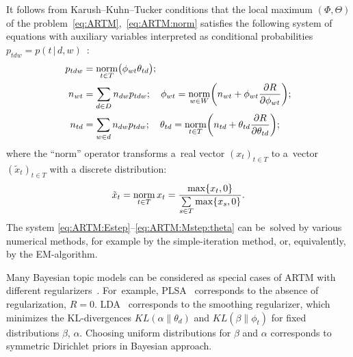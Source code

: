 \documentclass{acm_proc_article-sp}
\newcommand{\norm}{\mathop{\rm norm}\limits}
\newcommand{\cond}{\mspace{3mu}{|}\mspace{3mu}}
\begin{document}
It follows from Karush--Kuhn--Tucker conditions
that the \mbox{local} maximum $(\Phi,\Theta)$
of the problem~\eqref{eq:ARTM},~\eqref{eq:ARTM:norm}
satisfies the following system of equations
with auxiliary variables interpreted as conditional probabilities
${p_{tdw} = p(t\cond d,w)}$~\cite{voron14aist}:
\begin{align}
    \label{eq:ARTM:Estep}
    p_{tdw} &= \norm_{t\in T} \bigl(\phi_{wt}\theta_{td}\bigr);
\\
    \label{eq:ARTM:Mstep:phi}
    n_{wt} &= \sum_{d\in D} n_{dw} p_{tdw};\quad
    \phi_{wt} = \norm_{w\in W}
        \biggl(
            n_{wt} + \phi_{wt} \frac{\partial R}{\partial \phi_{wt}}
        \biggr);
\\
    \label{eq:ARTM:Mstep:theta}
    n_{td} &= \sum_{w\in d} n_{dw} p_{tdw};\quad
    \theta_{td} = \norm_{t\in T}
        \biggl(
            n_{td} + \theta_{td} \frac{\partial R}{\partial \theta_{td}}
        \biggr);
\end{align}
where the ``norm'' operator transforms
a~real vector $(x_t)_{t\in T}$ to
a~vector $(\tilde x_t)_{t\in T}$ with a discrete distribution:
\[
    \tilde x_t = \norm_{t\in T} x_t = \frac{\max\{x_t,0\}}{\sum\limits_{s\in T} \max\{x_s,0\}}.
\]
The system \eqref{eq:ARTM:Estep}--\eqref{eq:ARTM:Mstep:theta}
can be~solved by various numerical methods,
for example by the simple-iteration method,
or, equivalently, by the EM-algorithm.

Many Bayesian topic models can be considered
as special cases of ARTM with different regularizers~\cite{voron14aist,voron14mlj}.
For~example,
PLSA~\cite{hofmann99plsi} corresponds to the absence of regularization, ${R=0}$.
LDA~\cite{blei03latent} corresponds to the smoothing regularizer,
which minimizes the KL-divergences
$KL(\alpha\|\theta_d)$ and
$KL(\beta\|\phi_t)$
for fixed distributions $\beta$, $\alpha$.
Choosing uniform distributions for $\beta$ and $\alpha$
corresponds to symmetric Dirichlet priors in Bayesian approach.
\end{document}
